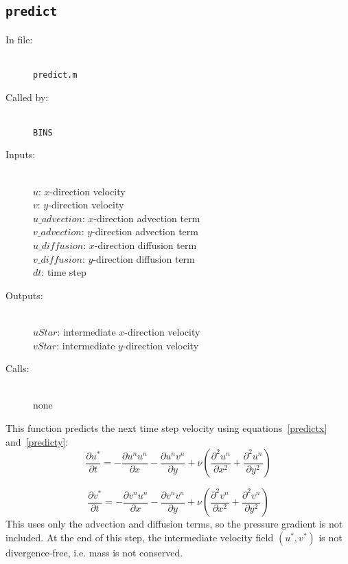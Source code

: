 \documentclass[12pt]{article}
\begin{document}
\subsection{\texttt{predict}}
\begin{description}
\item[In file:] \hfill \\ \texttt{predict.m}
\item[Called by:] \hfill \\ \texttt{BINS}
\item[Inputs:] \hfill \\ $u$: $x$-direction velocity\\$v$: $y$-direction velocity\\ $u\_advection$: $x$-direction advection term \\ $v\_advection$: $y$-direction advection term \\$u\_diffusion$: $x$-direction diffusion term \\$v\_diffusion$: $y$-direction diffusion term \\$dt$: time step
\item[Outputs:] \hfill \\ $uStar$: intermediate $x$-direction velocity \\ $vStar$: intermediate $y$-direction velocity
\item[Calls:] \hfill \\ none
\end{description}
This function predicts the next time step velocity using equations~\ref{predictx} and~\ref{predicty}:
\[ 
 \frac{\partial u^*}{\partial t} =   -\frac{\partial u^n u^n}{\partial x} -\frac{\partial u^n v^n}{\partial y} + \nu\left( \frac{\partial^2 u^n}{\partial x^2} + \frac{\partial^2 u^n}{\partial y^2}  \right)  \]

\[
  \frac{\partial v^*}{\partial t} =   -\frac{\partial v^n u^n}{\partial x} -\frac{\partial v^n v^n}{\partial y} + \nu\left( \frac{\partial^2 v^n}{\partial x^2} + \frac{\partial^2 v^n}{\partial y^2}  \right)
\]
This uses only the advection and diffusion terms, so the pressure gradient is not included.  At the end of this step, the intermediate velocity field $(u^*,v^*)$ is not divergence-free, i.e. mass is not conserved.
\end{document}

